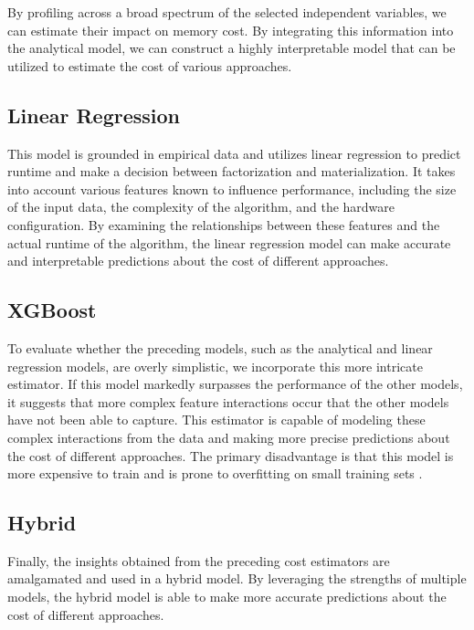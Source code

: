By profiling across a broad spectrum of the selected independent variables, we can estimate their impact on memory cost. By integrating this information into the analytical model, we can construct a highly interpretable model that can be utilized to estimate the cost of various approaches.

\subsection{Linear Regression}
This model is grounded in empirical data and utilizes linear regression to predict runtime and make a decision between factorization and materialization. It takes into account various features known to influence performance, including the size of the input data, the complexity of the algorithm, and the hardware configuration. By examining the relationships between these features and the actual runtime of the algorithm, the linear regression model can make accurate and interpretable predictions about the cost of different approaches.

\subsection{XGBoost}
To evaluate whether the preceding models, such as the analytical and linear regression models, are overly simplistic, we incorporate this more intricate estimator. If this model markedly surpasses the performance of the other models, it suggests that more complex feature interactions occur that the other models have not been able to capture. This estimator is capable of modeling these complex interactions from the data and making more precise predictions about the cost of different approaches. The primary disadvantage is that this model is more expensive to train and is prone to overfitting on small training sets \cite{xgboost}.

\subsection{Hybrid}
Finally, the insights obtained from the preceding cost estimators are amalgamated and used in a hybrid model. By leveraging the strengths of multiple models, the hybrid model is able to make more accurate predictions about the cost of different approaches.